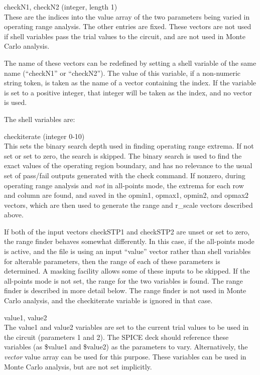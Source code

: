 \begin{description}
\item{\et checkN1, checkN2} (integer, length 1)\\
These are the indices into the {\et value} array of the two parameters being
varied in operating range analysis.  The other entries are fixed. 
These vectors are not used if shell variables pass the trial values to
the circuit, and are not used in Monte Carlo analysis.

The name of these vectors can be redefined by setting a shell variable
of the same name (``checkN1'' or ``checkN2'').  The value of this
variable, if a non-numeric string token, is taken as the name of a
vector containing the index.  If the variable is set to a positive
integer, that integer will be taken as the index, and no vector is
used.

\end{description}

The shell variables are:

\begin{description}
\item{\et checkiterate} (integer 0-10)\\
This sets the binary search depth used in finding operating range
extrema.  If not set or set to zero, the search is skipped.  The
binary search is used to find the exact values of the operating region
boundary, and has no relevance to the usual set of pass/fail outputs
generated with the {\cb check} command.  If nonzero, during operating
range analysis and {\it not} in all-points mode, the extrema for each
row and column are found, and saved in the {\et opmin1}, {\et opmax1},
{\et opmin2}, and {\et opmax2} vectors, which are then used to
generate the {\et range} and {\et r\_scale} vectors described above.

If both of the input vectors {\et checkSTP1} and {\et checkSTP2} are
unset or set to zero, the range finder behaves somewhat differently. 
In this case, if the all-points mode is active, and the file is using
an input ``value'' vector rather than shell variables for alterable
parameters, then the range of each of these parameters is determined. 
A masking facility allows some of these inputs to be skipped.  If the
all-points mode is not set, the range for the two variables is found. 
The range finder is described in more detail below.  The range finder
is not used in Monte Carlo analysis, and the {\et checkiterate}
variable is ignored in that case.

\item{\et value1, value2}\\
The {\et value1} and {\et value2} variables are set to the current
trial values to be used in the circuit (parameters 1 and 2).  The
SPICE deck should reference these variables (as {\vt \$value1} and
{\vt \$value2}) as the parameters to vary.  Alternatively, the {\it
vector} {\et value} array can be used for this purpose.  These
variables can be used in Monte Carlo analysis, but are not set
implicitly.
\end{description}

